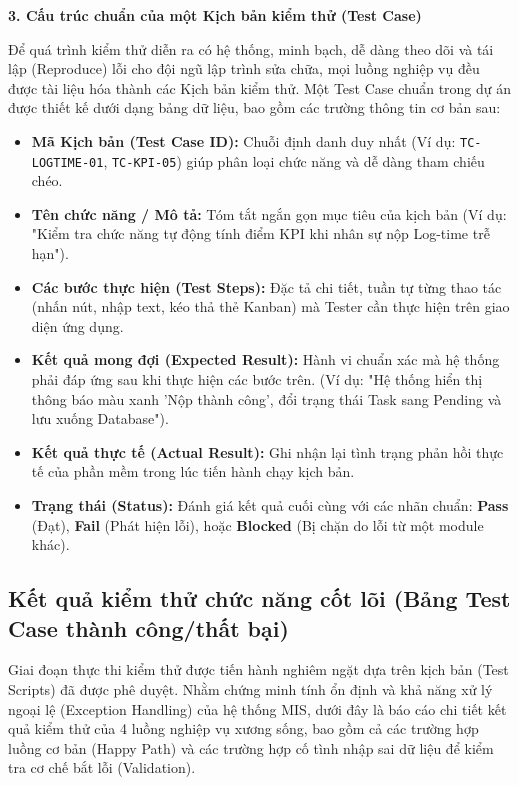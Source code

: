 \documentclass[a4paper,13.5pt]{extreport}
\begin{document}
\textbf{3. Cấu trúc chuẩn của một Kịch bản kiểm thử (Test Case)}

Để quá trình kiểm thử diễn ra có hệ thống, minh bạch, dễ dàng theo dõi và tái lập (Reproduce) lỗi cho đội ngũ lập trình sửa chữa, mọi luồng nghiệp vụ đều được tài liệu hóa thành các Kịch bản kiểm thử. Một Test Case chuẩn trong dự án được thiết kế dưới dạng bảng dữ liệu, bao gồm các trường thông tin cơ bản sau:

\begin{itemize}
    \item \textbf{Mã Kịch bản (Test Case ID):} Chuỗi định danh duy nhất (Ví dụ: \texttt{TC-LOGTIME-01}, \texttt{TC-KPI-05}) giúp phân loại chức năng và dễ dàng tham chiếu chéo.
    \item \textbf{Tên chức năng / Mô tả:} Tóm tắt ngắn gọn mục tiêu của kịch bản (Ví dụ: "Kiểm tra chức năng tự động tính điểm KPI khi nhân sự nộp Log-time trễ hạn").
    \item \textbf{Các bước thực hiện (Test Steps):} Đặc tả chi tiết, tuần tự từng thao tác (nhấn nút, nhập text, kéo thả thẻ Kanban) mà Tester cần thực hiện trên giao diện ứng dụng.
    \item \textbf{Kết quả mong đợi (Expected Result):} Hành vi chuẩn xác mà hệ thống phải đáp ứng sau khi thực hiện các bước trên. (Ví dụ: "Hệ thống hiển thị thông báo màu xanh 'Nộp thành công', đổi trạng thái Task sang Pending và lưu xuống Database").
    \item \textbf{Kết quả thực tế (Actual Result):} Ghi nhận lại tình trạng phản hồi thực tế của phần mềm trong lúc tiến hành chạy kịch bản.
    \item \textbf{Trạng thái (Status):} Đánh giá kết quả cuối cùng với các nhãn chuẩn: \textbf{Pass} (Đạt), \textbf{Fail} (Phát hiện lỗi), hoặc \textbf{Blocked} (Bị chặn do lỗi từ một module khác).
\end{itemize}
\subsection{Kết quả kiểm thử chức năng cốt lõi (Bảng Test Case thành công/thất bại)}

Giai đoạn thực thi kiểm thử được tiến hành nghiêm ngặt dựa trên kịch bản (Test Scripts) đã được phê duyệt. Nhằm chứng minh tính ổn định và khả năng xử lý ngoại lệ (Exception Handling) của hệ thống MIS, dưới đây là báo cáo chi tiết kết quả kiểm thử của 4 luồng nghiệp vụ xương sống, bao gồm cả các trường hợp luồng cơ bản (Happy Path) và các trường hợp cố tình nhập sai dữ liệu để kiểm tra cơ chế bắt lỗi (Validation).
\end{document}

